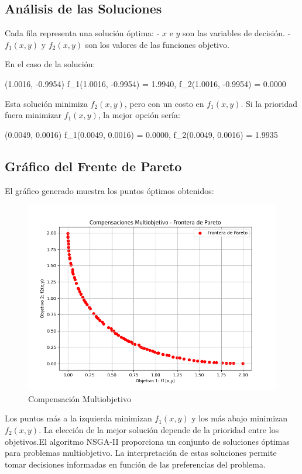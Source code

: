 \documentclass[12pt]{article}
\begin{document}
\subsection*{Análisis de las Soluciones}

Cada fila representa una solución óptima:
- $x$ e $y$ son las variables de decisión.
- $f_1(x,y)$ y $f_2(x,y)$ son los valores de las funciones objetivo.

En el caso de la solución:
\begin{center}
(1.0016, -0.9954) \Rightarrow f_1(1.0016, -0.9954) = 1.9940, \quad f_2(1.0016, -0.9954) = 0.0000
\end{center}

Esta solución minimiza $f_2(x,y)$, pero con un costo en $f_1(x,y)$. Si la prioridad fuera minimizar $f_1(x,y)$, la mejor opción sería:
\begin{center}
(0.0049, 0.0016) \Rightarrow f_1(0.0049, 0.0016) = 0.0000, \quad f_2(0.0049, 0.0016) = 1.9935
\end{center}

\subsection*{Gráfico del Frente de Pareto}

El gráfico generado muestra los puntos óptimos obtenidos:

\begin{figure}[H]
    \centering
    \includegraphics[width=0.9\linewidth]{Figure_2.png}
    \caption{Compensación Multiobjetivo}
    \label{fig:frente-pareto}
\end{figure}

Los puntos más a la izquierda minimizan $f_1(x,y)$ y los más abajo minimizan $f_2(x,y)$. La elección de la mejor solución depende de la prioridad entre los objetivos.El algoritmo NSGA-II proporciona un conjunto de soluciones óptimas para problemas multiobjetivo. La interpretación de estas soluciones permite tomar decisiones informadas en función de las preferencias del problema.
\end{document}

